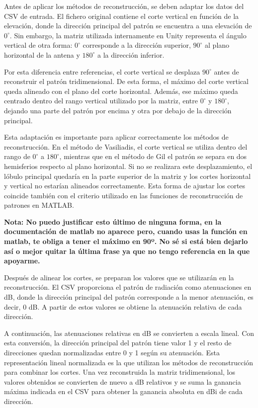 Antes de aplicar los métodos de reconstrucción, se deben adaptar los datos del CSV de entrada. El fichero original contiene el corte vertical en función de la elevación, donde la dirección principal del patrón se encuentra a una elevación de $0^\circ$. Sin embargo, la matriz utilizada internamente en Unity representa el ángulo vertical de otra forma: $0^\circ$ corresponde a la dirección superior, $90^\circ$ al plano horizontal de la antena y $180^\circ$ a la dirección inferior.

Por esta diferencia entre referencias, el corte vertical se desplaza $90^\circ$ antes de reconstruir el patrón tridimensional. De esta forma, el máximo del corte vertical queda alineado con el plano del corte horizontal. Además, ese máximo queda centrado dentro del rango vertical utilizado por la matriz, entre $0^\circ$ y $180^\circ$, dejando una parte del patrón por encima y otra por debajo de la dirección principal.

Esta adaptación es importante para aplicar correctamente los métodos de reconstrucción. En el método de Vasiliadis, el corte vertical se utiliza dentro del rango de $0^\circ$ a $180^\circ$, mientras que en el método de Gil el patrón se separa en dos hemisferios respecto al plano horizontal. Si no se realizara este desplazamiento, el lóbulo principal quedaría en la parte superior de la matriz y los cortes horizontal y vertical no estarían alineados correctamente. Esta forma de ajustar los cortes coincide también con el criterio utilizado en las funciones de reconstrucción de patrones en MATLAB.

\par\medskip
\textbf{Nota: No puedo justificar esto último de ninguna forma, en la documentación de matlab no aparece pero, cuando usas la función en matlab, te obliga a tener el máximo en 90º. No sé si está bien dejarlo así o mejor quitar la última frase ya que no tengo referencia en la que apoyarme.}
\par\medskip

Después de alinear los cortes, se preparan los valores que se utilizarán en la reconstrucción. El CSV proporciona el patrón de radiación como atenuaciones en dB, donde la dirección principal del patrón corresponde a la menor atenuación, es decir, 0 dB. A partir de estos valores se obtiene la atenuación relativa de cada dirección.

A continuación, las atenuaciones relativas en dB se convierten a escala lineal. Con esta conversión, la dirección principal del patrón tiene valor 1 y el resto de direcciones quedan normalizadas entre 0 y 1 según su atenuación. Esta representación lineal normalizada es la que utilizan los métodos de reconstrucción para combinar los cortes. Una vez reconstruida la matriz tridimensional, los valores obtenidos se convierten de nuevo a dB relativos y se suma la ganancia máxima indicada en el CSV para obtener la ganancia absoluta en dBi de cada dirección.

